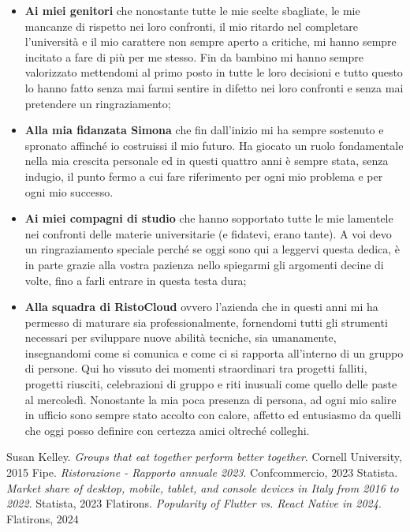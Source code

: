 \documentclass[a4paper, titlepage, 12pt, openright, twoside]{book}
\begin{document}
\begin{itemize}
	\item \textbf{Ai miei genitori} che nonostante tutte le mie scelte sbagliate, le mie mancanze di rispetto nei loro confronti, il mio ritardo nel completare l'università e il mio carattere non sempre aperto a critiche, mi hanno sempre incitato a fare di più per me stesso. Fin da bambino mi hanno sempre valorizzato mettendomi al primo posto in tutte le loro decisioni e tutto questo lo hanno fatto senza mai farmi sentire in difetto nei loro confronti e senza mai pretendere un ringraziamento;
	\item \textbf{Alla mia fidanzata Simona} che fin dall'inizio mi ha sempre sostenuto e spronato affinché io costruissi il mio futuro. Ha giocato un ruolo fondamentale nella mia crescita personale ed in questi quattro anni è sempre stata, senza indugio, il punto fermo a cui fare riferimento per ogni mio problema e per ogni mio successo.
	\item \textbf{Ai miei compagni di studio} che hanno sopportato tutte le mie lamentele nei confronti delle materie universitarie (e fidatevi, erano tante). A voi devo un ringraziamento speciale perché se oggi sono qui a leggervi questa dedica, è in parte grazie alla vostra pazienza nello spiegarmi gli argomenti decine di volte, fino a farli entrare in questa testa dura;
	\item \textbf{Alla squadra di RistoCloud} ovvero l'azienda che in questi anni mi ha permesso di maturare sia professionalmente, fornendomi tutti gli strumenti necessari per sviluppare nuove abilità tecniche, sia umanamente, insegnandomi come si comunica e come ci si rapporta all'interno di un gruppo di persone. Qui ho vissuto dei momenti straordinari tra progetti falliti, progetti riusciti, celebrazioni di gruppo e riti inusuali come quello delle paste al mercoledì. Nonostante la mia poca presenza di persona, ad ogni mio salire in ufficio sono sempre stato accolto con calore, affetto ed entusiasmo da quelli che oggi posso definire con certezza amici oltreché colleghi.
\end{itemize}

\begin{thebibliography}{4}
	 Susan Kelley. \textsl{Groups that eat together perform better together}. Cornell University, 2015
	 Fipe. \textsl{Ristorazione - Rapporto annuale 2023}. Confcommercio, 2023
	 Statista. \textsl{Market share of desktop, mobile, tablet, and console devices in Italy from 2016 to 2022}. Statista, 2023
	 Flatirons. \textsl{Popularity of Flutter vs. React Native in 2024}. Flatirons, 2024
\end{thebibliography}
\end{document}
